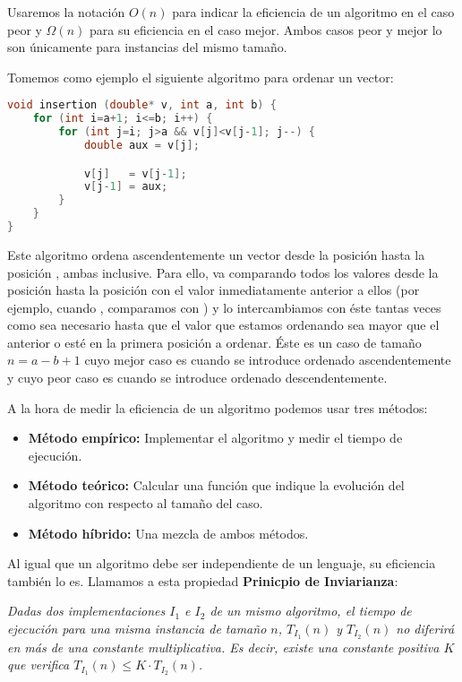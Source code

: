 Usaremos la notación $O(n)$ para indicar la eficiencia de un algoritmo en el caso peor y $\Omega(n)$ para su eficiencia en el caso mejor.
Ambos casos peor y mejor lo son únicamente para instancias del mismo tamaño.

\pagebreak

Tomemos como ejemplo el siguiente algoritmo para ordenar un vector:

\begin{lstlisting}[language=C++]
void insertion (double* v, int a, int b) {
	for (int i=a+1; i<=b; i++) {
		for (int j=i; j>a && v[j]<v[j-1]; j--) {
			double aux = v[j];

			v[j]   = v[j-1];
			v[j-1] = aux;
		}
	}
}
\end{lstlisting}

Este algoritmo ordena ascendentemente un vector  desde la posición  hasta la posición , ambas inclusive.
Para ello, va comparando todos los valores desde la posición  hasta la posición  con el valor inmediatamente anterior a ellos (por ejemplo, cuando , comparamos  con ) y lo intercambiamos con éste tantas veces como sea necesario hasta que el valor que estamos ordenando sea mayor que el anterior o esté en la primera posición a ordenar.
Éste es un caso de tamaño $n=a-b+1$ cuyo mejor caso es cuando  se introduce ordenado ascendentemente y cuyo peor caso es cuando  se introduce ordenado descendentemente.

A la hora de medir la eficiencia de un algoritmo podemos usar tres métodos:

\begin{itemize}
	\item\textbf{Método empírico:} Implementar el algoritmo y medir el tiempo de ejecución.
	\item\textbf{Método teórico:} Calcular una función que indique la evolución del algoritmo con respecto al tamaño del caso.
	\item\textbf{Método híbrido:} Una mezcla de ambos métodos.
\end{itemize}

Al igual que un algoritmo debe ser independiente de un lenguaje, su eficiencia también lo es.
Llamamos a esta propiedad \textbf{Prinicpio de Inviarianza}:

\begin{displayquote}
		  \textit{Dadas dos implementaciones $I_1$ e $I_2$ de un mismo algoritmo, el tiempo de ejecución para una misma instancia de tamaño $n$, $T_{I_1}(n)$ y $T_{I_2}(n)$ no diferirá en más de una constante multiplicativa. Es decir, existe una constante positiva $K$ que verifica $T_{I_1}(n)\leq K\cdot T_{I_2}(n)$.}
\end{displayquote}

